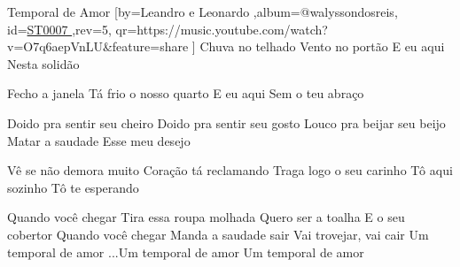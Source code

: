 \beginsong
{Temporal de Amor %
}[by={Leandro e Leonardo %
},album={@walyssondosreis},
id={\href{https://music.youtube.com/watch?v=O7q6aepVnLU&feature=share %
}{ST0007 %
}},rev={5}, %
qr={https://music.youtube.com/watch?v=O7q6aepVnLU&feature=share %
}]
\beginverse
Chuva no telhado
Vento no portão
E eu aqui
Nesta solidão
\endverse

\beginverse
Fecho a janela
Tá frio o nosso quarto
E eu aqui
Sem o teu abraço
\endverse

\beginverse
Doido pra sentir seu cheiro
Doido pra sentir seu gosto
Louco pra beijar seu beijo
Matar a saudade
Esse meu desejo
\endverse

\beginverse
Vê se não demora muito
Coração tá reclamando
Traga logo o seu carinho
Tô aqui sozinho
Tô te esperando
\endverse

\beginchorus
Quando você chegar
Tira essa roupa molhada
Quero ser a toalha
E o seu cobertor
Quando você chegar
Manda a saudade sair
Vai trovejar, vai cair
Um temporal de amor
\endchorus
{}
\beginverse
...Um temporal de amor
Um temporal de amor
\endverse

